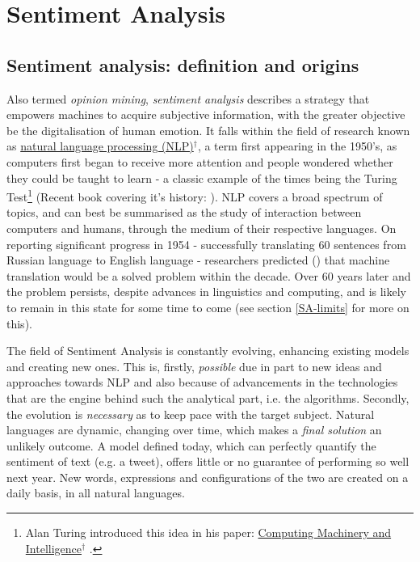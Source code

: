 \documentclass{article}
\begin{document}
\pagebreak

\pagebreak

\section{Sentiment Analysis \label{sentiment-analysis-chapter}}
\label{sec-4}


\subsection{Sentiment analysis: definition and origins \label{sent-defn}}
\label{sec-4-1}
Also termed \emph{opinion mining}, \emph{sentiment analysis} describes a strategy that empowers machines to acquire subjective information, with the greater objective be the digitalisation of human emotion. It falls within the field of research known as \href{https://en.wikipedia.org/wiki/Natural_language_processing}{natural language processing (NLP)$^{\dag{}}$}, a term first appearing in the 1950's, as computers first began to receive more attention and people wondered whether they could be taught to learn - a classic example of the times being the Turing Test\footnote{Alan Turing introduced this idea in his paper: \href{https://en.wikipedia.org/wiki/Computing_Machinery_and_Intelligence}{Computing Machinery and Intelligence$^{\dag{}}$} \cite{turing1950computing}.} (Recent book covering it's history: \cite{Saygin2003}). NLP covers a broad spectrum of topics, and can best be summarised as the study of interaction between computers and humans, through the medium of their respective languages. On reporting significant progress in 1954 - successfully translating 60 sentences from Russian language to English language - researchers predicted (\cite{dostert1955georgetown}) that machine translation would be a solved problem within the decade. Over 60 years later and the problem persists, despite advances in linguistics and computing, and is likely to remain in this state for some time to come (see section \ref{SA-limits} for more on this).

The field of Sentiment Analysis is constantly evolving, enhancing existing models and creating new ones. This is, firstly, \emph{possible} due in part to new ideas and approaches towards NLP and also because of advancements in the technologies that are the engine behind such the analytical part, i.e. the algorithms. Secondly, the evolution is \emph{necessary} as to keep pace with the target subject. Natural languages are dynamic, changing over time, which makes a \emph{final solution} an unlikely outcome. A model defined today, which can perfectly quantify the sentiment of text (e.g. a tweet), offers little or no guarantee of performing so well next year. New words, expressions and configurations of the two are created on a daily basis, in all natural languages.
\end{document}
